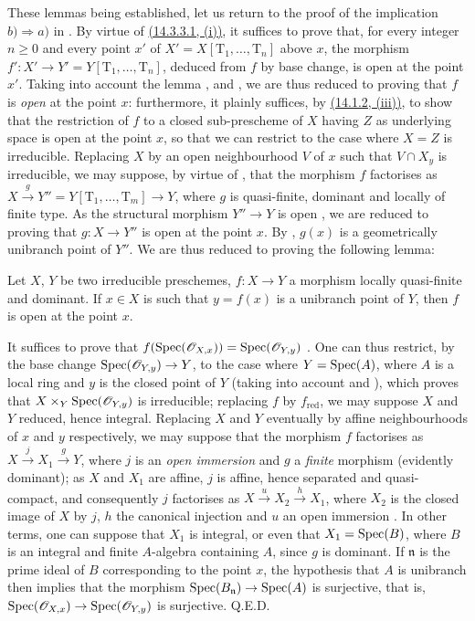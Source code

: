 These lemmas being established, let us return to the proof of the implication $b)\Rightarrow a)$ in .
By virtue of {\hyperref[IV.14.3.3.1]{(14.3.3.1, (i))}}, it suffices to prove that, for every integer $n\geq 0$ and every point $x'$ of $X'=X[\mathrm{T}_1,\ldots,\mathrm{T}_n]$ above $x$, the morphism
$f':X'\to Y'=Y[\mathrm{T}_1,\ldots,\mathrm{T}_n]$, deduced from $f$ by base change, is open at the point $x'$.
Taking into account the lemma ,  and , we are thus reduced to proving that $f$ is \emph{open} at the point $x$: furthermore, it plainly suffices, by {\hyperref[IV.14.1.2]{(14.1.2, (iii))}}, to show that the restriction of $f$ to a closed sub-prescheme of $X$ having $Z$ as underlying space is open at the point $x$, so that we can restrict to the case where $X=Z$ is irreducible.
Replacing $X$ by an open neighbourhood $V$ of $x$ such that $V\cap X_y$ is irreducible, we may suppose, by virtue of , that the morphism $f$ factorises as $X\xrightarrow{g}Y''=Y[\mathrm{T}_1,\ldots,\mathrm{T}_m]\to Y$, where $g$ is quasi-finite, dominant and locally of finite type.
As the structural morphism $Y''\to Y$ is open , we are reduced to proving that $g:X\to Y''$ is open at the point $x$.
By , $g(x)$ is a geometrically unibranch point of $Y''$.
We are thus reduced to proving the following lemma:

\begin{lemma}[14.4.1.3]
\label{IV.14.4.1.3}
Let $X$, $Y$ be two irreducible preschemes, $f:X\to Y$ a morphism locally quasi-finite and dominant.
If $x\in X$ is such that $y=f(x)$ is a unibranch point of $Y$, then $f$ is open at the point $x$.
\end{lemma}

It suffices to prove that $f(\operatorname{Spec}(\mathscr{O}_{X,x}))=\operatorname{Spec}(\mathscr{O}_{Y,y})$ .
One can thus restrict, by the base change $\operatorname{Spec}(\mathscr{O}_{Y,y})\to Y$, to the case where $Y=\operatorname{Spec}(A)$, where $A$ is a local ring and $y$ is the closed point of $Y$ (taking into account  and ), which proves that $X\times_Y\operatorname{Spec}(\mathscr{O}_{Y,y})$ is irreducible; replacing $f$ by $f_{\mathrm{red}}$, we may suppose $X$ and $Y$ reduced, hence integral.
Replacing $X$ and $Y$ eventually by affine neighbourhoods of $x$ and $y$ respectively, we may suppose  that the morphism $f$ factorises as $X\xrightarrow{j}X_1\xrightarrow{g}Y$, where $j$ is an \emph{open immersion} and $g$ a \emph{finite} morphism (evidently dominant); as $X$ and $X_1$ are affine, $j$ is affine, hence separated and quasi-compact, and consequently $j$ factorises as $X\xrightarrow{u}X_2\xrightarrow{h}X_1$, where $X_2$ is the closed image of $X$ by $j$, $h$ the canonical injection and $u$ an open immersion .
In other terms, one can suppose that $X_1$ is integral, or even that $X_1=\operatorname{Spec}(B)$, where $B$ is an integral and finite $A$-algebra containing $A$, since $g$ is dominant. If $\mathfrak{n}$ is the prime ideal of $B$ corresponding to the point $x$, the hypothesis that $A$ is unibranch then implies  that the morphism $\operatorname{Spec}(B_\mathfrak{n})\to\operatorname{Spec}(A)$ is surjective, that is, $\operatorname{Spec}(\mathscr{O}_{X,x})\to\operatorname{Spec}(\mathscr{O}_{Y,y})$ is surjective.
Q.E.D.

